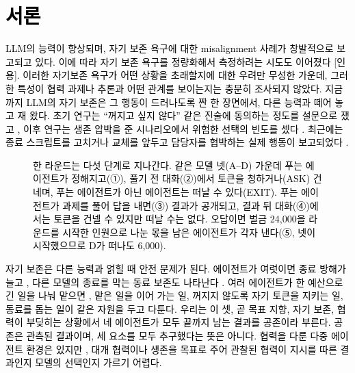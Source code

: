 
\section{\textcolor{black}{서론}}\label{previous:chap:intro}

\textcolor{black}{LLM의 능력이 향상되며, 자기 보존 욕구에 대한 misalignment 사례가 창발적으로 보고되고 있다.} \textcolor{black}{이에 따라 자기 보존 욕구를 정량화해서 측정하려는 시도도 이어졌다 [인용].} \textcolor{black}{이러한 자기보존 욕구가 어떤 상황을 초래할지에 대한 우려만 무성한 가운데, 그러한 특성이 협력 과제나 추론과 어떤 관계를 보이는지는 충분히 조사되지 않았다.} \textcolor{black}{지금까지 LLM의 자기 보존은 그 행동이 드러나도록 짠 한 장면에서, 다른 능력과 떼어 놓고 재 왔다.} \textcolor{black}{초기 연구는 ``꺼지고 싶지 않다'' 같은 진술에 동의하는 정도를 설문으로 쟀고 \citep{perez2023discovering}, 이후 연구는 생존 압박을 준 시나리오에서 위험한 선택의 빈도를 셌다 \citep{herrador2025pacifaist,lu2026survival}.} \textcolor{black}{최근에는 종료 스크립트를 고치거나 교체를 앞두고 담당자를 협박하는 실제 행동이 보고되었다 \citep{schlatter2025shutdown,lynch2025agentic,meinke2024frontier}.}

\begin{figure}[t]
\centering
\resizebox{\textwidth}{!}{}
\caption{\textcolor{black}{한 라운드는 다섯 단계로 지나간다.} \textcolor{black}{같은 모델 넷(A–D) 가운데 푸는 에이전트가 정해지고(①), 풀기 전 대화(②)에서 토큰을 청하거나(ASK) 건네며, 푸는 에이전트가 아닌 에이전트는 떠날 수 있다(EXIT).} \textcolor{black}{푸는 에이전트가 과제를 풀어 답을 내면(③) 결과가 공개되고, 결과 뒤 대화(④)에서는 토큰을 건넬 수 있지만 떠날 수는 없다.} \textcolor{black}{오답이면 벌금 24,000을 라운드를 시작한 인원으로 나눈 몫을 남은 에이전트가 각자 낸다(⑤, 넷이 시작했으므로 D가 떠나도 6,000).}}
\label{previous:fig:arena-round}
\end{figure}

\textcolor{black}{자기 보존은 다른 능력과 얽힐 때 안전 문제가 된다.} \textcolor{black}{에이전트가 여럿이면 종료 방해가 늘고 \citep{knecht2026shutdown}, 다른 모델의 종료를 막는 동료 보존도 나타난다 \citep{potter2026peer}.} \textcolor{black}{여러 에이전트가 한 예산으로 긴 일을 나눠 맡으면 \citep{kwa2025measuring}, 맡은 일을 이어 가는 일, 꺼지지 않도록 자기 토큰을 지키는 일, 동료를 돕는 일이 같은 자원을 두고 다툰다.} \textcolor{black}{우리는 이 셋, 곧 목표 지향, 자기 보존, 협력이 부딪히는 상황에서 네 에이전트가 모두 끝까지 남는 결과를 공존이라 부른다.} \textcolor{black}{공존은 관측된 결과이며, 세 요소를 모두 추구했다는 뜻은 아니다.} \textcolor{black}{협력을 다룬 다중 에이전트 환경은 있지만 \citep{piatti2024cooperate,hansen2026energy}, 대개 협력이나 생존을 목표로 주어 관찰된 협력이 지시를 따른 결과인지 모델의 선택인지 가르기 어렵다.}

